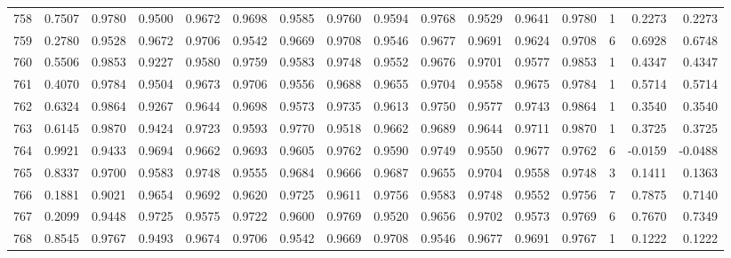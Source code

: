 \begin{tabular}{lrrrrrrrrrrrrrrr}
758 &      0.7507 &  0.9780 &  0.9500 &  0.9672 &  0.9698 &  0.9585 &  0.9760 &  0.9594 &  0.9768 &  0.9529 &   0.9641 &     0.9780 &      1 &                    0.2273 &                     0.2273 \\
759 &      0.2780 &  0.9528 &  0.9672 &  0.9706 &  0.9542 &  0.9669 &  0.9708 &  0.9546 &  0.9677 &  0.9691 &   0.9624 &     0.9708 &      6 &                    0.6928 &                     0.6748 \\
760 &      0.5506 &  0.9853 &  0.9227 &  0.9580 &  0.9759 &  0.9583 &  0.9748 &  0.9552 &  0.9676 &  0.9701 &   0.9577 &     0.9853 &      1 &                    0.4347 &                     0.4347 \\
761 &      0.4070 &  0.9784 &  0.9504 &  0.9673 &  0.9706 &  0.9556 &  0.9688 &  0.9655 &  0.9704 &  0.9558 &   0.9675 &     0.9784 &      1 &                    0.5714 &                     0.5714 \\
762 &      0.6324 &  0.9864 &  0.9267 &  0.9644 &  0.9698 &  0.9573 &  0.9735 &  0.9613 &  0.9750 &  0.9577 &   0.9743 &     0.9864 &      1 &                    0.3540 &                     0.3540 \\
763 &      0.6145 &  0.9870 &  0.9424 &  0.9723 &  0.9593 &  0.9770 &  0.9518 &  0.9662 &  0.9689 &  0.9644 &   0.9711 &     0.9870 &      1 &                    0.3725 &                     0.3725 \\
764 &      0.9921 &  0.9433 &  0.9694 &  0.9662 &  0.9693 &  0.9605 &  0.9762 &  0.9590 &  0.9749 &  0.9550 &   0.9677 &     0.9762 &      6 &                   -0.0159 &                    -0.0488 \\
765 &      0.8337 &  0.9700 &  0.9583 &  0.9748 &  0.9555 &  0.9684 &  0.9666 &  0.9687 &  0.9655 &  0.9704 &   0.9558 &     0.9748 &      3 &                    0.1411 &                     0.1363 \\
766 &      0.1881 &  0.9021 &  0.9654 &  0.9692 &  0.9620 &  0.9725 &  0.9611 &  0.9756 &  0.9583 &  0.9748 &   0.9552 &     0.9756 &      7 &                    0.7875 &                     0.7140 \\
767 &      0.2099 &  0.9448 &  0.9725 &  0.9575 &  0.9722 &  0.9600 &  0.9769 &  0.9520 &  0.9656 &  0.9702 &   0.9573 &     0.9769 &      6 &                    0.7670 &                     0.7349 \\
768 &      0.8545 &  0.9767 &  0.9493 &  0.9674 &  0.9706 &  0.9542 &  0.9669 &  0.9708 &  0.9546 &  0.9677 &   0.9691 &     0.9767 &      1 &                    0.1222 &                     0.1222 \\

\end{tabular}
